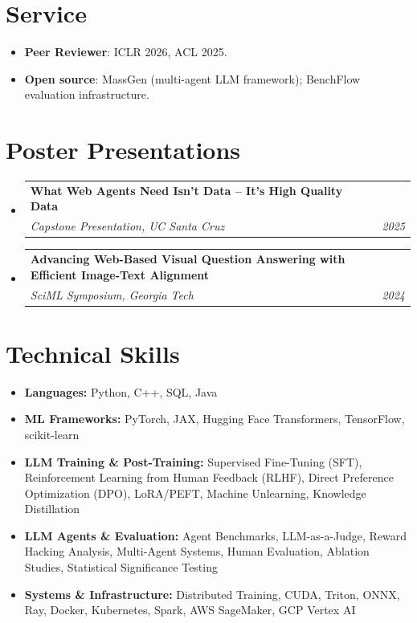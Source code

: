 \documentclass[letterpaper,11pt]{article}
\makeatletter
\newcommand{\resumeSubheading}[4]{
  \vspace{-2pt}\item
    \begin{tabular*}{0.97\textwidth}[t]{l@{\extracolsep{\fill}}r}
      \textbf{#1} & #2 \\
      \textit{\small #3} & \textit{\small #4} \\
    \end{tabular*}\vspace{-10pt}
}
\newcommand{\resumeSubHeadingListStart}{\begin{itemize}[leftmargin=0.15in, label={}]}
\newcommand{\resumeSubHeadingListEnd}{\end{itemize}}
\makeatother
\begin{document}
\section{Service}
\begin{itemize}[leftmargin=0.2in, itemsep=-1mm]
  \small
  \item \textbf{Peer Reviewer}: ICLR 2026, ACL 2025.
  \item \textbf{Open source}: MassGen (multi-agent LLM framework); BenchFlow evaluation infrastructure.
\end{itemize}

\section{Poster Presentations}
\resumeSubHeadingListStart
    \resumeSubheading
    {What Web Agents Need Isn't Data -- It's High Quality Data}{}
    {Capstone Presentation, UC Santa Cruz}{2025}
    \resumeSubheading
    {Advancing Web-Based Visual Question Answering with Efficient Image-Text Alignment}{}
    {SciML Symposium, Georgia Tech}{2024}
\resumeSubHeadingListEnd

\section{Technical Skills}
\begin{itemize}[leftmargin=0.2in, itemsep=-1mm]
  \small
  \item \textbf{Languages:} Python, C++, SQL, Java

  \item \textbf{ML Frameworks:} PyTorch, JAX, Hugging Face Transformers, TensorFlow, scikit-learn

  \item \textbf{LLM Training \& Post-Training:} Supervised Fine-Tuning (SFT), Reinforcement Learning from Human Feedback (RLHF), Direct Preference Optimization (DPO), LoRA/PEFT, Machine Unlearning, Knowledge Distillation

  \item \textbf{LLM Agents \& Evaluation:} Agent Benchmarks, LLM-as-a-Judge, Reward Hacking Analysis, Multi-Agent Systems, Human Evaluation, Ablation Studies, Statistical Significance Testing

  \item \textbf{Systems \& Infrastructure:} Distributed Training, CUDA, Triton, ONNX, Ray, Docker, Kubernetes, Spark, AWS SageMaker, GCP Vertex AI
\end{itemize}
\end{document}
